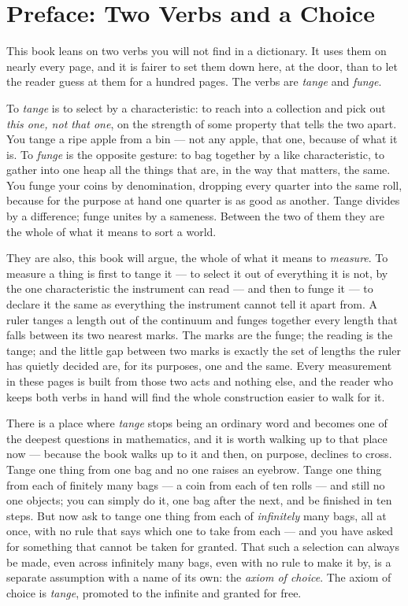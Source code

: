 \chapter*{Preface: Two Verbs and a Choice}

This book leans on two verbs you will not find in a dictionary. It uses them on nearly every page, and it is fairer
to set them down here, at the door, than to let the reader guess at them for a hundred pages. The verbs are
\emph{tange} and \emph{funge}.

To \emph{tange} is to select by a characteristic: to reach into a collection and pick out \emph{this one, not that
one}, on the strength of some property that tells the two apart. You tange a ripe apple from a bin --- not any apple,
that one, because of what it is. To \emph{funge} is the opposite gesture: to bag together by a like characteristic, to
gather into one heap all the things that are, in the way that matters, the same. You funge your coins by denomination,
dropping every quarter into the same roll, because for the purpose at hand one quarter is as good as another. Tange
divides by a difference; funge unites by a sameness. Between the two of them they are the whole of what it means to
sort a world.

They are also, this book will argue, the whole of what it means to \emph{measure}. To measure a thing is first to
tange it --- to select it out of everything it is not, by the one characteristic the instrument can read --- and then
to funge it --- to declare it the same as everything the instrument cannot tell it apart from. A ruler tanges a length
out of the continuum and funges together every length that falls between its two nearest marks. The marks are the
funge; the reading is the tange; and the little gap between two marks is exactly the set of lengths the ruler has
quietly decided are, for its purposes, one and the same. Every measurement in these pages is built from those two acts
and nothing else, and the reader who keeps both verbs in hand will find the whole construction easier to walk for it.

\medskip

There is a place where \emph{tange} stops being an ordinary word and becomes one of the deepest questions in
mathematics, and it is worth walking up to that place now --- because the book walks up to it and then, on purpose,
declines to cross. Tange one thing from one bag and no one raises an eyebrow. Tange one thing from each of finitely
many bags --- a coin from each of ten rolls --- and still no one objects; you can simply do it, one bag after the
next, and be finished in ten steps. But now ask to tange one thing from each of \emph{infinitely} many bags, all at
once, with no rule that says which one to take from each --- and you have asked for something that cannot be taken for
granted. That such a selection can always be made, even across infinitely many bags, even with no rule to make it by,
is a separate assumption with a name of its own: the \emph{axiom of choice}. The axiom of choice is \emph{tange},
promoted to the infinite and granted for free.

